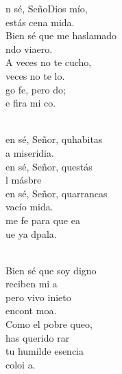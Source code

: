 \begin{cancion}%
	n sé, SeñoDios mío, \\
	 estás cena mida.\\
	Bien sé que me haslamado \\
	ndo viaero.\\
	A veces no te cucho, \\
	veces no te lo.\\
	go fe, pero do; \\
	e fira mi co.  \\\jump\\
	\begin{chorus}%
	en sé, Señor, quhabitas \\
	a miseridia. \\
	en sé, Señor, questás\\
	l másbre\\
	en sé, Señor, quarrancas\\
	vacío mida. \\
	me fe para que ea\\
	ue ya  dpala.\\
	\end{chorus}%
	\jump\\
	Bien sé que soy digno \\
	reciben mi a\\
	pero vivo inieto\\
	 encont  moa.\\
	Como el pobre queo, \\
	 has querido rar\\
	 tu humilde esencia \\
	 coloi a. \\
\end{cancion}%
